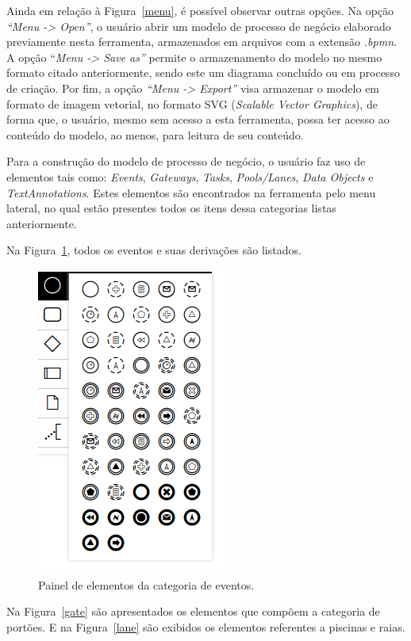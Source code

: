 Ainda em relação à Figura~\ref{menu}, é possível observar outras opções. Na opção \textit{``Menu -> Open''}, o usuário abrir um modelo de processo de negócio elaborado previamente nesta ferramenta, armazenados em arquivos com a extensão \textit{.bpmn}. A opção ``\textit{Menu -> Save as''} permite o armazenamento do modelo no mesmo formato citado anteriormente, sendo este um diagrama concluído ou em processo de criação. Por fim, a opção \textit{``Menu -> Export''} visa armazenar o modelo em formato de imagem vetorial, no formato SVG (\textit{Scalable Vector Graphics}), de forma que, o usuário, mesmo sem acesso a esta ferramenta, possa ter acesso ao conteúdo do modelo, ao menos, para leitura de seu conteúdo.

Para a construção do modelo de processo de negócio, o usuário faz uso de elementos tais como: \textit{Events}, \textit{Gateways}, \textit{Tasks}, \textit{Pools/Lanes}, \textit{Data Objects} e \textit{TextAnnotations}. Estes elementos são encontrados na ferramenta pelo menu lateral, no qual estão presentes todos os itens dessa categorias listas anteriormente.

Na Figura~\ref{eventos}, todos os eventos e suas derivações são listados.

\begin{figure}[!htb]
\centering
\includegraphics[scale=0.75]{images/eventos.png}
\caption{Painel de elementos da categoria de eventos.}
\label{eventos}
\end{figure}

Na Figura~\ref{gate} são apresentados os elementos que compõem a categoria de portões. E na Figura~\ref{lane} são exibidos os elementos referentes a piscinas e raias.

